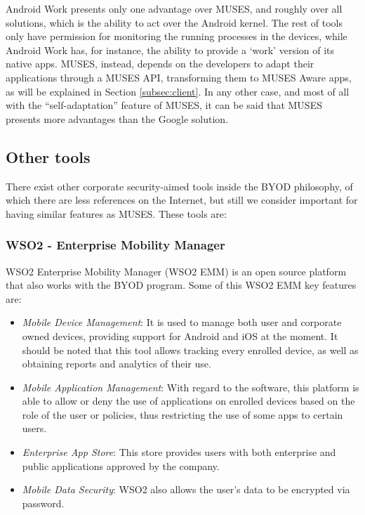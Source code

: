 Android Work presents only one advantage over MUSES, and roughly over all solutions, which is the ability to act over the Android kernel. The rest of tools only have permission for monitoring the running processes in the devices, while Android Work has, for instance, the ability to provide a `work' version of its native apps. MUSES, instead, depends on the developers to adapt their applications through a MUSES API, transforming them to MUSES Aware apps, as will be explained in Section \ref{subsec:client}. In any other case, and most of all with the ``self-adaptation'' feature of MUSES, it can be said that MUSES presents more advantages than the Google solution.


\subsection{Other tools}
\label{subsec:othertools}

There exist other corporate security-aimed tools inside the BYOD philosophy, of which there are less references on the Internet, but still we consider important for having similar features as MUSES. These tools are:

\subsubsection{WSO2 - Enterprise Mobility Manager}

WSO2 Enterprise Mobility Manager (WSO2 EMM) \cite{WSO2_tool} is an open source platform that also works with the BYOD program. Some of this WSO2 EMM key features are:

\begin{itemize}
  \item \textit{Mobile Device Management}: It is used to manage both user and corporate owned devices, providing support for Android and iOS at the moment. It should be noted that this tool allows tracking every enrolled device, as well as obtaining reports and analytics of their use.
  \item \textit{Mobile Application Management}: With regard to the software, this platform is able to allow or deny the use of applications on enrolled devices based on the role of the user or policies, thus restricting the use of some apps to certain users.
  \item \textit{Enterprise App Store}: This store provides users with both enterprise and public applications approved by the company.
  \item \textit{Mobile Data Security}: WSO2 also allows the user's data to be encrypted via password.
\end{itemize}

